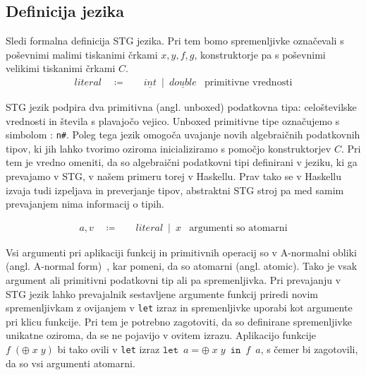 
\subsection{Definicija jezika}
\label{sec:stg-definicija}


Sledi formalna definicija STG jezika. Pri tem bomo spremenljivke oz\-na\-če\-va\-li s poševnimi malimi tiskanimi črkami $x, y, f, g$, konstruktorje pa s poševnimi velikimi tiskanimi črkami $C$.
\begin{align*}
	literal \quad \coloneq& \quad \underline{int} \enspace \vert \enspace \underline{double} & \text{primitivne vrednosti}
\end{align*}

STG jezik podpira dva primitivna (angl. unboxed) podatkovna tipa: celoštevilske vrednosti in števila s plavajočo vejico. Unboxed primitivne tipe označujemo s simbolom : \texttt{n\#}. Poleg tega jezik omogoča uvajanje novih algebraičnih podatkovnih tipov, ki jih lahko tvorimo oziroma inicializiramo s pomočjo konstruktorjev $C$. Pri tem je vredno omeniti, da so algebraični podatkovni tipi definirani v jeziku, ki ga prevajamo v STG, v našem primeru torej v Haskellu. Prav tako se v Haskellu izvaja tudi izpeljava in preverjanje tipov, abstraktni STG stroj pa med samim prevajanjem nima informacij o tipih.

\begin{align*}
	a, v \quad \coloneq& \quad literal \enspace \vert \enspace x & \text{argumenti so atomarni}
\end{align*}

Vsi argumenti pri aplikaciji funkcij in primitivnih operacij so v A-normalni obliki (angl. A-normal form)~\cite{flanagan1993essence}, kar pomeni, da so atomarni (angl. atomic).  Tako je vsak argument ali primitivni podatkovni tip ali pa spremenljivka. Pri prevajanju v STG jezik lahko prevajalnik sestavljene argumente funkcij priredi novim spremenljivkam z ovijanjem v \texttt{let} izraz in spremenljivke uporabi kot argumente pri klicu funkcije. Pri tem je potrebno zagotoviti, da so definirane spremenljivke unikatne oziroma, da se ne pojavijo v ovitem izrazu. Aplikacijo funkcije $f \; (\oplus \; x \; y)$ bi tako ovili v \texttt{let} izraz $\texttt{let} \enspace a = \oplus \; x \; y \enspace \texttt{in} \enspace f \enspace a$, s čemer bi zagotovili, da so vsi argumenti atomarni.

